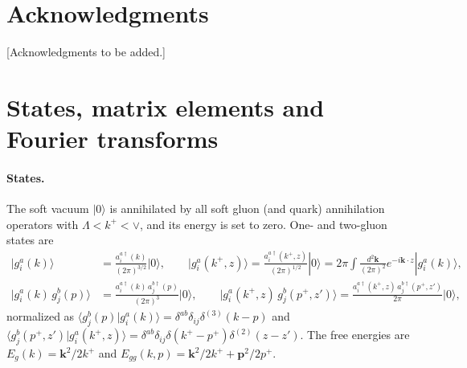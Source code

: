 \documentclass[aps,prd,onecolumn,superscriptaddress,nofootinbib,floatfix,longbibliography,11pt]{revtex4-2}
\newcommand{\subseclabel}{\Alph{subsection}}
\renewcommand{\thesection}{\Roman{section}}
\renewcommand{\thesubsection}{\thesection.\Alph{subsection}}
\numberwithin{equation}{section}
\newenvironment{acknowledgments}{\section*{Acknowledgments}}{}
\begin{document}
\begin{acknowledgments}
[Acknowledgments to be added.]
\end{acknowledgments}

\appendix
\ifrevtex\else
  \renewcommand{\subseclabel}{\arabic{subsection}}
  \renewcommand{\thesubsection}{\thesection.\arabic{subsection}}
\fi
\section{States, matrix elements and Fourier transforms}\label{app:conv}

\paragraph*{States.} The soft vacuum $|0\rangle$ is annihilated by all soft gluon (and quark) annihilation operators with $\Lambda<k^+<\vee$, and its energy is set to zero. One- and two-gluon states are
\begin{align}
|g^a_i(k)\rangle&=\frac{a^{a\dagger}_i(k)}{(2\pi)^{3/2}}|0\rangle,\qquad |g^a_i(k^+,z)\rangle=\frac{a^{a\dagger}_i(k^+,z)}{(2\pi)^{1/2}}|0\rangle=2\pi\int\frac{d^2\mathbf k}{(2\pi)^2}e^{-i\mathbf k\cdot z}|g^a_i(k)\rangle,\\
|g^a_i(k)\,g^b_j(p)\rangle&=\frac{a^{a\dagger}_i(k)\,a^{b\dagger}_j(p)}{(2\pi)^3}|0\rangle,\qquad |g^a_i(k^+,z)\,g^b_j(p^+,z')\rangle=\frac{a^{a\dagger}_i(k^+,z)\,a^{b\dagger}_j(p^+,z')}{2\pi}|0\rangle,
\end{align}
normalized as $\langle g^b_j(p)|g^a_i(k)\rangle=\delta^{ab}\delta_{ij}\delta^{(3)}(k-p)$ and $\langle g^b_j(p^+,z')|g^a_i(k^+,z)\rangle=\delta^{ab}\delta_{ij}\delta(k^+-p^+)\delta^{(2)}(z-z')$. The free energies are $E_g(k)=\mathbf k^2/2k^+$ and $E_{gg}(k,p)=\mathbf k^2/2k^++\mathbf p^2/2p^+$.
\end{document}
